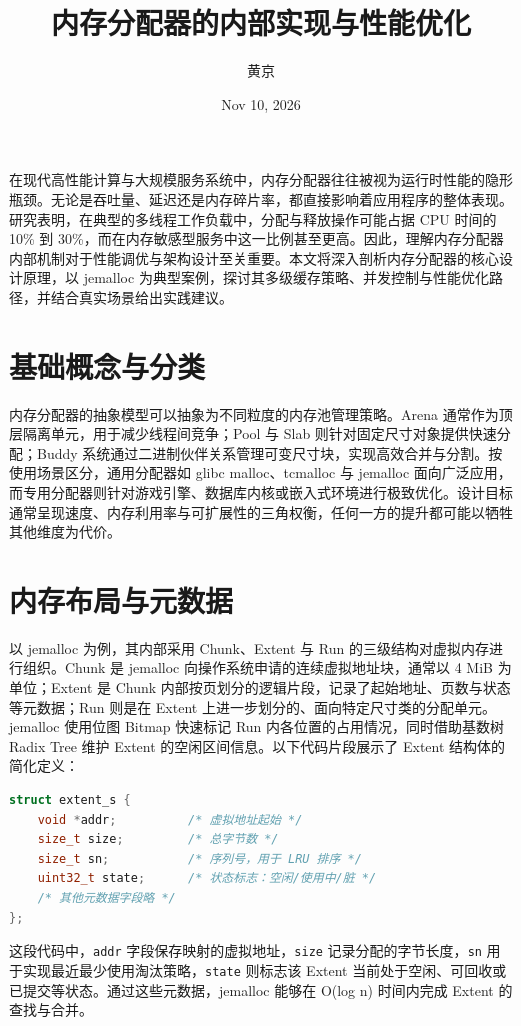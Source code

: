 \title{内存分配器的内部实现与性能优化}
\author{黄京}
\date{Nov 10, 2026}
\maketitle
在现代高性能计算与大规模服务系统中，内存分配器往往被视为运行时性能的隐形瓶颈。无论是吞吐量、延迟还是内存碎片率，都直接影响着应用程序的整体表现。研究表明，在典型的多线程工作负载中，分配与释放操作可能占据 CPU 时间的 10\%{} 到 30\%{}，而在内存敏感型服务中这一比例甚至更高。因此，理解内存分配器内部机制对于性能调优与架构设计至关重要。本文将深入剖析内存分配器的核心设计原理，以 jemalloc 为典型案例，探讨其多级缓存策略、并发控制与性能优化路径，并结合真实场景给出实践建议。\par
\chapter{基础概念与分类}
内存分配器的抽象模型可以抽象为不同粒度的内存池管理策略。Arena 通常作为顶层隔离单元，用于减少线程间竞争；Pool 与 Slab 则针对固定尺寸对象提供快速分配；Buddy 系统通过二进制伙伴关系管理可变尺寸块，实现高效合并与分割。按使用场景区分，通用分配器如 glibc malloc、tcmalloc 与 jemalloc 面向广泛应用，而专用分配器则针对游戏引擎、数据库内核或嵌入式环境进行极致优化。设计目标通常呈现速度、内存利用率与可扩展性的三角权衡，任何一方的提升都可能以牺牲其他维度为代价。\par
\chapter{内存布局与元数据}
以 jemalloc 为例，其内部采用 Chunk、Extent 与 Run 的三级结构对虚拟内存进行组织。Chunk 是 jemalloc 向操作系统申请的连续虚拟地址块，通常以 4 MiB 为单位；Extent 是 Chunk 内部按页划分的逻辑片段，记录了起始地址、页数与状态等元数据；Run 则是在 Extent 上进一步划分的、面向特定尺寸类的分配单元。jemalloc 使用位图 Bitmap 快速标记 Run 内各位置的占用情况，同时借助基数树 Radix Tree 维护 Extent 的空闲区间信息。以下代码片段展示了 Extent 结构体的简化定义：\par
\begin{lstlisting}[language=c]
struct extent_s {
    void *addr;          /* 虚拟地址起始 */
    size_t size;         /* 总字节数 */
    size_t sn;           /* 序列号，用于 LRU 排序 */
    uint32_t state;      /* 状态标志：空闲/使用中/脏 */
    /* 其他元数据字段略 */
};
\end{lstlisting}
这段代码中，\texttt{addr} 字段保存映射的虚拟地址，\texttt{size} 记录分配的字节长度，\texttt{sn} 用于实现最近最少使用淘汰策略，\texttt{state} 则标志该 Extent 当前处于空闲、可回收或已提交等状态。通过这些元数据，jemalloc 能够在 O(log n) 时间内完成 Extent 的查找与合并。\par
